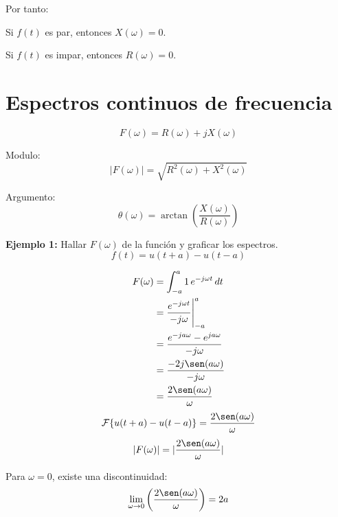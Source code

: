 Por tanto:

Si $f(t)$ es par, entonces $X(\omega)=0$.

Si $f(t)$ es impar, entonces $R(\omega)=0$.

\section{Espectros continuos de frecuencia}
\begin{equation*}
    F(\omega)=R(\omega)+jX(\omega)
\end{equation*}

Modulo:
\begin{equation*}
    |F(\omega)|=\sqrt{R^2(\omega)+X^2(\omega)}
\end{equation*}

Argumento:
\begin{equation*}
    \theta(\omega)=\arctan\left(\frac{X(\omega)}{R(\omega)}\right)
\end{equation*}

\textbf{Ejemplo 1:} Hallar $F(\omega)$ de la función y graficar los espectros.
\begin{equation*}
    f(t)=u(t+a)-u(t-a)
\end{equation*}
\begin{figure}[H]
    \centering
    
\end{figure}
\begin{equation*}
\begin{split}
    F(\omega)
        &=\int_{-a}^a 1\,e^{-j\omega t}\,dt\\
        &=\frac{e^{-j\omega t}}{-j\omega}\Biggr|_{-a}^a\\
        &=\frac{e^{-ja\omega}-e^{ja\omega}}{-j\omega}\\
        &=\frac{-2j\sen(a\omega)}{-j\omega}\\
        &=\frac{2\sen(a\omega)}{\omega}\\
\end{split}
\end{equation*}
\begin{equation}
    \mathcal{F}\{u(t+a)-u(t-a)\}=\frac{2\sen(a\omega)}{\omega}
\end{equation}
\begin{equation*}
    |F(\omega)|=|\frac{2\sen(a\omega)}{\omega}|
\end{equation*}

Para $\omega=0$, existe una discontinuidad:
\begin{equation*}
    \lim_{\omega\to0}\left(\frac{2\sen(a\omega)}{\omega}\right)=2a
\end{equation*}
\begin{figure}[H]
    \centering
    \begin{minipage}{.4\textwidth}
        \centering
        
    \end{minipage}
    \begin{minipage}{.4\textwidth}
        \centering
        
    \end{minipage}
\end{figure}

